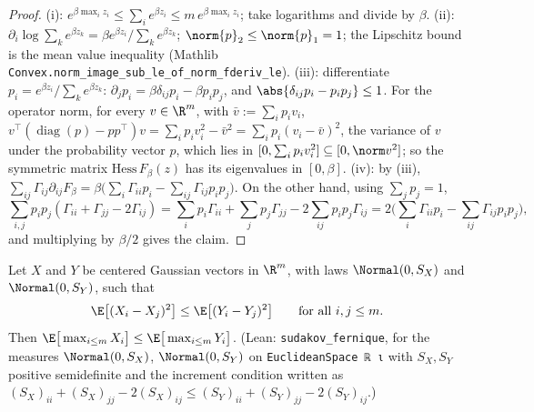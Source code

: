 \begin{proof}
\leanok
(i): $e^{\beta\max_i z_i} \le \sum_i e^{\beta z_i} \le m\,e^{\beta\max_i z_i}$; take logarithms
and divide by $\beta$. (ii): $\partial_i\log\sum_ke^{\beta z_k} = \beta e^{\beta z_i}/\sum_ke^{\beta z_k}$;
$\norm{p}_2 \le \norm{p}_1 = 1$; the Lipschitz bound is the mean value inequality
(Mathlib \texttt{Convex.norm\_image\_sub\_le\_of\_norm\_fderiv\_le}). (iii): differentiate
$p_i = e^{\beta z_i}/\sum_k e^{\beta z_k}$: $\partial_jp_i = \beta\delta_{ij}p_i - \beta p_ip_j$,
and $\abs{\delta_{ij}p_i - p_ip_j}\le 1$. For the operator norm, for every $v\in\R^m$, with
$\bar v := \sum_ip_iv_i$,
$v^\top(\operatorname{diag}(p) - pp^\top)v = \sum_ip_iv_i^2 - \bar v^2 = \sum_ip_i(v_i-\bar v)^2$,
the variance of $v$ under the probability vector $p$, which lies in
$[0, \sum_ip_iv_i^2]\subseteq[0,\norm v^2]$; so the symmetric matrix
$\mathrm{Hess}\,F_\beta(z)$ has its eigenvalues in $[0,\beta]$. (iv): by (iii),
$\sum_{ij}\Gamma_{ij}\partial_{ij}F_\beta = \beta\big(\sum_i\Gamma_{ii}p_i - \sum_{ij}\Gamma_{ij}p_ip_j\big)$.
On the other hand, using $\sum_jp_j = 1$,
\[
  \sum_{i,j}p_ip_j(\Gamma_{ii}+\Gamma_{jj}-2\Gamma_{ij})
  = \sum_ip_i\Gamma_{ii} + \sum_jp_j\Gamma_{jj} - 2\sum_{ij}p_ip_j\Gamma_{ij}
  = 2\Big(\sum_i\Gamma_{ii}p_i - \sum_{ij}\Gamma_{ij}p_ip_j\Big),
\]
and multiplying by $\beta/2$ gives the claim.
\end{proof}

\begin{theorem}\label{thm:sudakov_fernique}
\leanok
{}
Let $X$ and $Y$ be centered Gaussian vectors in $\R^m$, with laws $\Normal(0,S_X)$ and
$\Normal(0,S_Y)$, such that
\[
  \E\big[(X_i - X_j)^2\big] \le \E\big[(Y_i - Y_j)^2\big] \qquad\text{for all } i,j\le m .
\]
Then $\E\big[\max_{i\le m}X_i\big] \le \E\big[\max_{i\le m}Y_i\big]$.
(Lean: \texttt{sudakov\_fernique}, for the measures $\Normal(0,S_X)$, $\Normal(0,S_Y)$ on
\texttt{EuclideanSpace ℝ ι} with $S_X, S_Y$ positive semidefinite and the increment condition
written as $(S_X)_{ii} + (S_X)_{jj} - 2(S_X)_{ij} \le (S_Y)_{ii} + (S_Y)_{jj} - 2(S_Y)_{ij}$.)
\end{theorem}

